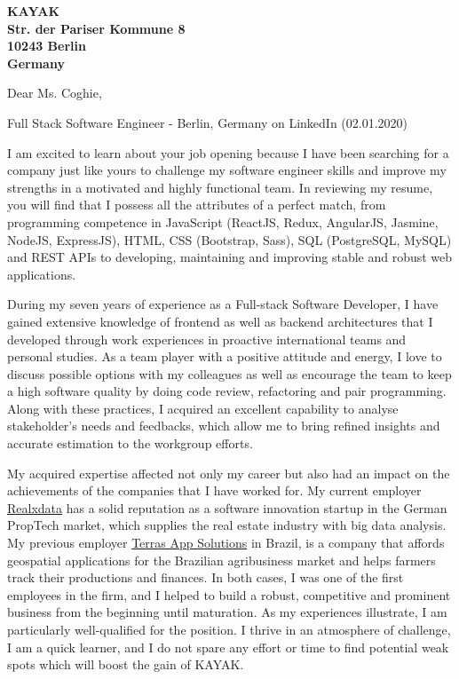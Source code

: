 \documentclass[a4paper]{joaosoares-letter}
\begin{document}
\longindentation=0pt

\begin{letter}{\bfseries KAYAK\\Str. der Pariser Kommune 8\\10243 Berlin\\Germany}


\date{Berlin, \today}


\opening{Dear Ms. Coghie,}{Full Stack Software Engineer - Berlin, Germany on LinkedIn (02.01.2020)}

I am excited to learn about your job opening because I have been searching for a company just like yours to challenge my software engineer skills and improve my strengths in a motivated and highly functional team. In reviewing my resume, you will find that I possess all the attributes of a perfect match, from programming competence in JavaScript (ReactJS, Redux, AngularJS, Jasmine, NodeJS, ExpressJS), HTML, CSS (Bootstrap, Sass), SQL (PostgreSQL, MySQL) and REST APIs to developing, maintaining and improving stable and robust web applications.

During my seven years of experience as a Full-stack Software Developer, I have gained extensive knowledge of frontend as well as backend architectures that I developed through work experiences in proactive international teams and personal studies. As a team player with a positive attitude and energy, I love to discuss possible options with my colleagues as well as encourage the team to keep a high software quality by doing code review, refactoring and pair programming. Along with these practices, I acquired an excellent capability to analyse stakeholder's needs and feedbacks, which allow me to bring refined insights and accurate estimation to the workgroup efforts.

My acquired expertise affected not only my career but also had an impact on the achievements of the companies that I have worked for. My current employer \href{https://www.realxdata.com/}{Realxdata} has a solid reputation as a software innovation startup in the German PropTech market, which supplies the real estate industry with big data analysis. My previous employer \href{http://terras.agr.br/}{Terras App Solutions} in Brazil, is a company that affords geospatial applications for the Brazilian agribusiness market and helps farmers track their productions and finances. In both cases, I was one of the first employees in the firm, and I helped to build a robust, competitive and prominent business from the beginning until maturation. As my experiences illustrate, I am particularly well-qualified for the position. I thrive in an atmosphere of challenge, I am a quick learner, and I do not spare any effort or time to find potential weak spots which will boost the gain of KAYAK.


\end{letter}
\end{document}
